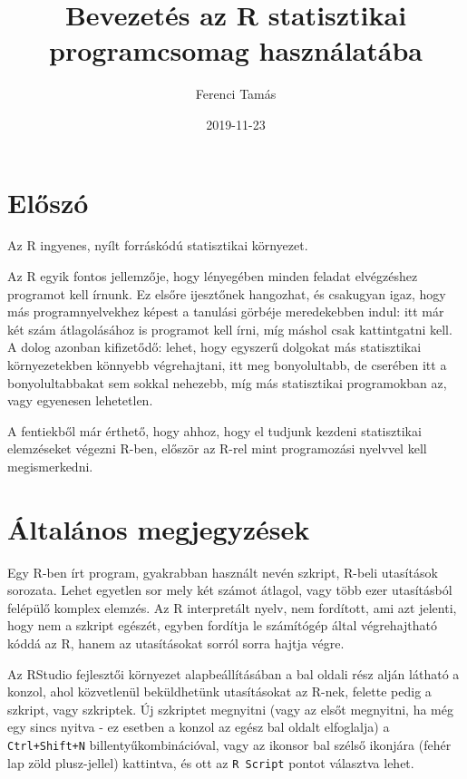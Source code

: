 \documentclass[]{book}
\title{Bevezetés az R statisztikai programcsomag használatába}
\author{Ferenci Tamás}
\date{2019-11-23}
\begin{document}
\maketitle

{
\setcounter{tocdepth}{1}
\tableofcontents
}
\hypertarget{elux151szuxf3}{%
\chapter{Előszó}\label{elux151szuxf3}}

Az R ingyenes, nyílt forráskódú statisztikai környezet.

Az R egyik fontos jellemzője, hogy lényegében minden feladat elvégzéshez programot kell írnunk. Ez elsőre ijesztőnek hangozhat, és csakugyan igaz, hogy más programnyelvekhez képest a tanulási görbéje meredekebben indul: itt már két szám átlagolásához is programot kell írni, míg máshol csak kattintgatni kell. A dolog azonban kifizetődő: lehet, hogy egyszerű dolgokat más statisztikai környezetekben könnyebb végrehajtani, itt meg bonyolultabb, de cserében itt a bonyolultabbakat sem sokkal nehezebb, míg más statisztikai programokban az, vagy egyenesen lehetetlen.

A fentiekből már érthető, hogy ahhoz, hogy el tudjunk kezdeni statisztikai elemzéseket végezni R-ben, először az R-rel mint programozási nyelvvel kell megismerkedni.

\hypertarget{uxe1ltaluxe1nos-megjegyzuxe9sek}{%
\chapter{Általános megjegyzések}\label{uxe1ltaluxe1nos-megjegyzuxe9sek}}

Egy R-ben írt program, gyakrabban használt nevén szkript, R-beli utasítások sorozata. Lehet egyetlen sor mely két számot átlagol, vagy több ezer utasításból felépülő komplex elemzés. Az R interpretált nyelv, nem fordított, ami azt jelenti, hogy nem a szkript egészét, egyben fordítja le számítógép által végrehajtható kóddá az R, hanem az utasításokat sorról sorra hajtja végre.

Az RStudio fejlesztői környezet alapbeállításában a bal oldali rész alján látható a konzol, ahol közvetlenül beküldhetünk utasításokat az R-nek, felette pedig a szkript, vagy szkriptek. Új szkriptet megnyitni (vagy az elsőt megnyitni, ha még egy sincs nyitva - ez esetben a konzol az egész bal oldalt elfoglalja) a \texttt{Ctrl+Shift+N} billentyűkombinációval, vagy az ikonsor bal szélső ikonjára (fehér lap zöld plusz-jellel) kattintva, és ott az \texttt{R\ Script} pontot választva lehet.
\end{document}
